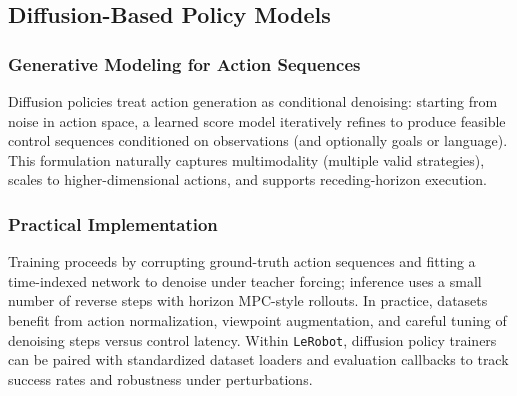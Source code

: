 \subsection{Diffusion-Based Policy Models}
\subsubsection{Generative Modeling for Action Sequences}
Diffusion policies treat action generation as conditional denoising: starting from noise in action space, a learned score model iteratively refines to produce feasible control sequences conditioned on observations (and optionally goals or language). This formulation naturally captures multimodality (multiple valid strategies), scales to higher-dimensional actions, and supports receding-horizon execution.

\subsubsection{Practical Implementation}
Training proceeds by corrupting ground-truth action sequences and fitting a time-indexed network to denoise under teacher forcing; inference uses a small number of reverse steps with horizon MPC-style rollouts. In practice, datasets benefit from action normalization, viewpoint augmentation, and careful tuning of denoising steps versus control latency. Within \texttt{LeRobot}, diffusion policy trainers can be paired with standardized dataset loaders and evaluation callbacks to track success rates and robustness under perturbations.